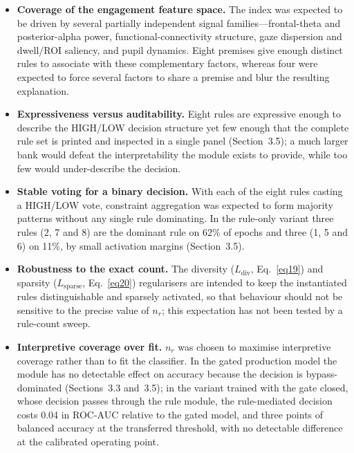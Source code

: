 \documentclass[pdflatex,sn-basic,Numbered]{sn-jnl}
\begin{document}
\begin{itemize}
\item \textbf{Coverage of the engagement feature space.} The index was expected to be driven by several partially independent signal families---frontal-theta and posterior-alpha power, functional-connectivity structure, gaze dispersion and dwell/ROI saliency, and pupil dynamics. Eight premises give enough distinct rules to associate with these complementary factors, whereas four were expected to force several factors to share a premise and blur the resulting explanation.
\item \textbf{Expressiveness versus auditability.} Eight rules are expressive enough to describe the HIGH/LOW decision structure yet few enough that the complete rule set is printed and inspected in a single panel (Section~3.5); a much larger bank would defeat the interpretability the module exists to provide, while too few would under-describe the decision.
\item \textbf{Stable voting for a binary decision.} With each of the eight rules casting a HIGH/LOW vote, constraint aggregation was expected to form majority patterns without any single rule dominating. In the rule-only variant three rules (2, 7 and 8) are the dominant rule on 62\% of epochs and three (1, 5 and 6) on 11\%, by small activation margins (Section~3.5).
\item \textbf{Robustness to the exact count.} The diversity ($L_{\mathrm{div}}$, Eq.~\eqref{eq19}) and sparsity ($L_{\mathrm{sparse}}$, Eq.~\eqref{eq20}) regularisers are intended to keep the instantiated rules distinguishable and sparsely activated, so that behaviour should not be sensitive to the precise value of $n_r$; this expectation has not been tested by a rule-count sweep.
\item \textbf{Interpretive coverage over fit.} $n_r$ was chosen to maximise interpretive coverage rather than to fit the classifier. In the gated production model the module has no detectable effect on accuracy because the decision is bypass-dominated (Sections~3.3 and~3.5); in the variant trained with the gate closed, whose decision passes through the rule module, the rule-mediated decision costs 0.04 in ROC-AUC relative to the gated model, and three points of balanced accuracy at the transferred threshold, with no detectable difference at the calibrated operating point.
\end{itemize}
\end{document}
